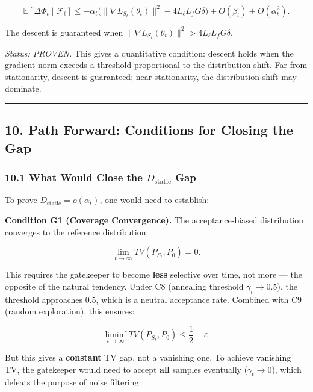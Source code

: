 \documentclass[
  12pt,
]{ctexart}
\begin{document}
\[\mathbb{E}[\Delta\Phi_t \mid \mathcal{F}_t] \leq -\alpha_t \bigl(\|\nabla L_{S_t}(\theta_t)\|^2 - 4 L_\ell L_f G \delta \bigr) + O(\beta_t) + O(\alpha_t^2).\]

The descent is guaranteed when
\(\|\nabla L_{S_t}(\theta_t)\|^2 > 4 L_\ell L_f G \delta\).

\emph{Status: PROVEN.} This gives a quantitative condition: descent
holds when the gradient norm exceeds a threshold proportional to the
distribution shift. Far from stationarity, descent is guaranteed; near
stationarity, the distribution shift may dominate.

\begin{center}\rule{0.5\linewidth}{0.5pt}\end{center}

\subsection{10. Path Forward: Conditions for Closing the
Gap}\label{path-forward-conditions-for-closing-the-gap}

\subsubsection{\texorpdfstring{10.1 What Would Close the
\(D_{\text{static}}\)
Gap}{10.1 What Would Close the D\_\{\textbackslash text\{static\}\} Gap}}\label{what-would-close-the-d_textstatic-gap}

To prove \(D_{\text{static}} = o(\alpha_t)\), one would need to
establish:

\textbf{Condition G1 (Coverage Convergence).} The acceptance-biased
distribution converges to the reference distribution:

\[\lim_{t \to \infty} TV(P_{S_t}, P_0) = 0.\]

This requires the gatekeeper to become \textbf{less} selective over
time, not more --- the opposite of the natural tendency. Under C8
(annealing threshold \(\gamma_t \to 0.5\)), the threshold approaches
0.5, which is a neutral acceptance rate. Combined with C9 (random
exploration), this ensures:

\[\liminf_{t \to \infty} TV(P_{S_t}, P_0) \leq \frac{1}{2} - \varepsilon.\]

But this gives a \textbf{constant} TV gap, not a vanishing one. To
achieve vanishing TV, the gatekeeper would need to accept \textbf{all}
samples eventually (\(\gamma_t \to 0\)), which defeats the purpose of
noise filtering.
\end{document}
